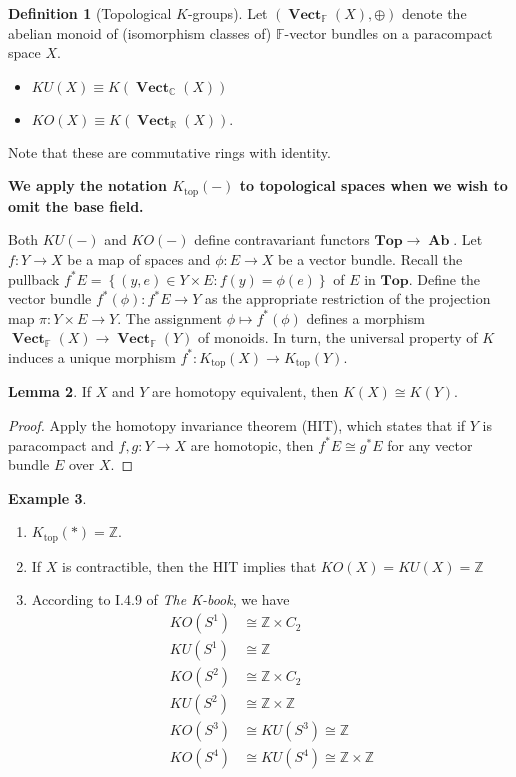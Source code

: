 \documentclass[10pt,letterpaper,cm]{nupset}
\theoremstyle{definition}
\newtheorem{definition}{Definition}[section]
\newtheorem{exmp}[definition]{Example}
\theoremstyle{theorem}
\newtheorem{lemma}[definition]{Lemma}
\theoremstyle{remark}
\newcommand{\C}{\mathbb C}
\newcommand{\F}{\mathbb F}
\newcommand{\R}{\mathbb R}
\newcommand{\Z}{\mathbb Z}
\newcommand{\1}{\mathbf{1}}
\newcommand{\0}{\vec 0}
\DeclareMathOperator{\vect}{\mathbf{Vect}}
\DeclareMathOperator{\topp}{\mathrm{top}}
\DeclareMathOperator{\Ab}{\mathbf{Ab}}
\begin{document}
\begin{definition}[Topological $K$-groups]
Let $\left(\vect_{\F}(X), \oplus\right)$ denote the abelian monoid of (isomorphism classes of) $\F$-vector bundles on a paracompact space $X$. 
\begin{itemize}
\item $KU(X) \equiv K(\vect_{\C}(X))$ 
\item $KO(X) \equiv K(\vect_{\R}(X)).$
\end{itemize}
\end{definition}

Note that these are commutative rings with identity. 

\smallskip

\begin{center}
 \textbf{We apply the notation $K_{\topp}(-)$ to topological spaces when we wish to omit the base field.}
\end{center}

\medskip

Both $KU(-)$ and $KO(-)$ define contravariant functors $\mathbf{Top} \to \Ab$. Let $f: Y \to X$ be a map of spaces and $\phi : E \to X$ be a vector bundle. Recall the pullback $f^{\ast}E = \left\{\left(y, e\right) \in Y \times E : f(y) = \phi(e)\right\}$ of $E$ in $\mathbf{Top}$.  Define the vector bundle $f^{\ast}(\phi) : f^{\ast}E \to Y$ as the appropriate restriction of the projection map $\pi : Y \times E \to Y$. The assignment $\phi \mapsto f^{\ast}(\phi)$ defines a morphism  $\vect_{\F}(X) \to \vect_{\F}(Y)$ of monoids. In turn, the universal property of $K$ induces a unique morphism $f^{\ast}: K_{\topp}(X) \to K_{\topp}(Y)$.


\begin{lemma}
If $X$ and $Y$ are homotopy equivalent, then $K(X) \cong K(Y)$.
\end{lemma}
\begin{proof}
Apply the homotopy invariance theorem (HIT), which states that if $Y$ is paracompact and $f, g: Y \to X$ are homotopic, then $f^{\ast}E \cong g^{\ast}E$ for any vector bundle $E$ over $X$.
\end{proof}

\begin{exmp} $ $
\begin{enumerate}
\item $K_{\topp}(\ast) = \Z$.
\item If $X$ is contractible, then the HIT implies that $KO(X) = KU(X) = \Z$
\item According to I.4.9 of \textit{The K-book}, we have
\begin{align*}
KO(S^1) & \cong \Z \times C_2 
\\ KU(S^1) &  \cong \Z \\
KO(S^2) & \cong \Z \times C_2  
\\  KU(S^2) & \cong \Z \times \Z
\\ KO(S^3) & \cong KU(S^3) \cong \Z 
\\ KO(S^4) & \cong KU(S^4) \cong \Z \times \Z
\end{align*}
\end{enumerate}
\end{exmp}
\end{document}
